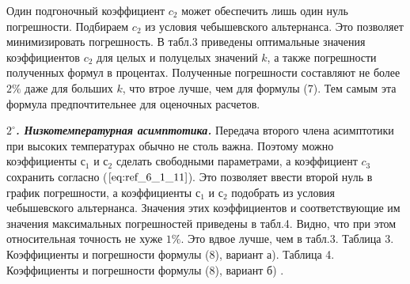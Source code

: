 Один подгоночный коэффициент $c_2$ может обеспечить лишь один нуль погрешности.
Подбираем $c_2$ из условия чебышевского альтернанса. Это позволяет минимизировать погрешность.
В табл.3 приведены оптимальные значения коэффициентов $c_2$ для целых и полуцелых значений $k$, а также погрешности полученных формул в процентах. Полученные погрешности составляют не более $2\%$ даже для больших $k$, что втрое лучше, чем для формулы (7). Тем самым эта формула предпочтительнее для оценочных расчетов.

\textbf{\textit{$2^{\circ}$. Низкотемпературная асимптотика.}} Передача второго члена асимптотики при высоких температурах обычно не
столь важна. Поэтому можно коэффициенты $с_1$ и $с_2$ сделать свободными параметрами,
а коэффициент $c_3$ сохранить согласно ($\ref{eq:ref_6_1_11}$). Это позволяет ввести второй нуль в график
погрешности, а коэффициенты $с_1$ и $с_2$ подобрать из условия чебышевского альтернанса.
Значения этих коэффициентов и соответствующие им значения максимальных погрешностей приведены в табл.4. Видно, что при этом относительная точность не хуже $1\%$. Это вдвое лучше, чем в табл.3.
Таблица 3. Коэффициенты и погрешности
формулы (8), вариант а).
Таблица 4. Коэффициенты и погрешности
формулы (8), вариант б) .


